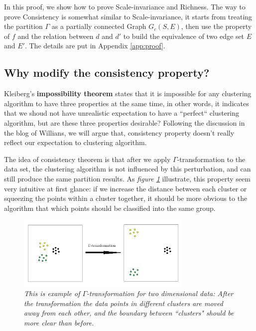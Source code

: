 \documentclass{uonmathreport}
\begin{document}
In this proof, we show how to prove Scale-invariance and Richness. The way to prove Consistency is somewhat similar to Scale-invariance, it starts from treating the partition $\Gamma$ as a partially connected Graph $G_c(S,E)$, then use the property of $f$ and the relation between $d$ and $d'$ to build the equivalence of two edge set $E$ and $E'$. The details are put in Appendix \ref{app:proof}.


\subsection{Why modify the consistency property?} \label{subsec: motivation for modifying consistency}
Kleiberg's \textbf{impossibility theorem} states that it is impossible for any clustering algorithm to have three properties at the same time, in other words, it indicates that we shoud not have unrealistic expectation to have a ``perfect“ clustering algorithm, but are these three properties desirable? Following the discussion in the blog of Willians\cite{williams_2015}, we will argue that, consistency property doesn't really reflect our expectation to clustering algorithm.

The idea of consistency theorem is that after we apply $\Gamma$-transformation to the data set, the clustering algorithm is not influenced by this perturbation, and can still produce the same partition results. As \textit{figure \ref{fig:bsd1}} illustrate, this property seem very intuitive at first glance: if we increase the distance between each cluster or squeezing the points within a cluster together, it should be more obvious to the algorithm that which points should be classified into the same group.
\begin{figure}[H]
 \begin{center}
   \includegraphics[width=0.75\textwidth]{Paper_figure_1.png}
 \end{center}
 \caption{\textit{This is example of $\Gamma$-transformation for two dimensional data: After the transformation the data points in different clusters are moved away from each other, and the boundary between ``clusters" should be more clear than before.}}
 \label{fig:bsd1}
\end{figure}
\end{document}
